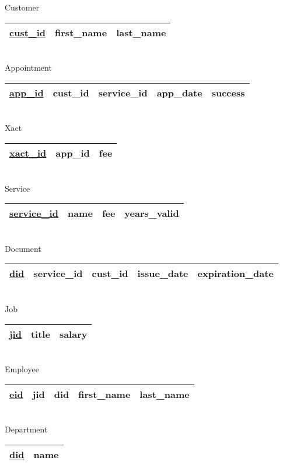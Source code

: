 \documentclass[12pt]{article}
\newcommand{\ul}{\underline}
\begin{document}
\begin{center}
\begin{minipage}{0.5\linewidth}
Customer
\begin{tabular}[l]{|c|c|c|}
	\hline
	\ul{cust\_id} &first\_name &last\_name\\
	\hline
\end{tabular}\\

Appointment
\begin{tabular}[l]{|c|c|c|c|c|}
	\hline
	\ul{app\_id} &cust\_id &service\_id &app\_date &success\\
	\hline
\end{tabular}\\

Xact
\begin{tabular}[l]{|c|c|c|}
	\hline
	\ul{xact\_id} &app\_id &fee\\
	\hline
\end{tabular}\\

Service
\begin{tabular}[l]{|c|c|c|c|}
	\hline
	\ul{service\_id} &name &fee &years\_valid\\
	\hline
\end{tabular}\\

Document
\begin{tabular}[l]{|c|c|c|c|c|}
	\hline
	\ul{did} &service\_id &cust\_id &issue\_date &expiration\_date\\
	\hline
\end{tabular}\\

Job
\begin{tabular}[l]{|c|c|c|}
	\hline
	\ul{jid} &title &salary\\
	\hline
\end{tabular}\\

Employee
\begin{tabular}[l]{|c|c|c|c|c|}
	\hline
	\ul{eid} &jid &did &first\_name &last\_name\\
	\hline
\end{tabular}\\

Department
\begin{tabular}[l]{|c|c|}
	\hline
	\ul{did} &name\\
	\hline
\end{tabular}

\end{minipage}
\end{center}
\end{document}
